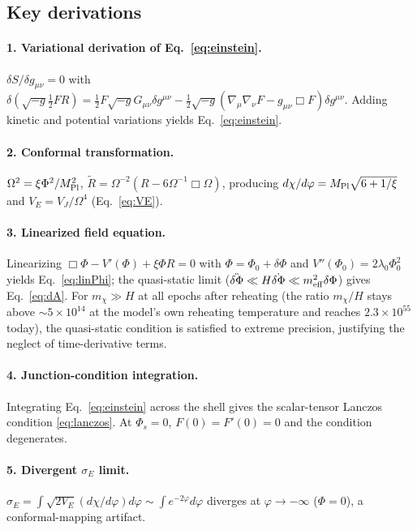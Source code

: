 \documentclass[pdflatex,sn-mathphys-num]{sn-jnl}
\newcommand{\MP}{M_{\rm Pl}}
\newcommand{\PhiV}{\Phi_0}
\theoremstyle{thmstyleone}
\begin{document}
\begin{appendices}
\section{Key derivations}

\paragraph{1. Variational derivation of Eq.~\eqref{eq:einstein}.} $\delta S/\delta g_{\mu\nu}=0$ with $\delta(\sqrt{-g}\frac12 FR)=\frac12 F\sqrt{-g}G_{\mu\nu}\delta g^{\mu\nu}-\frac12\sqrt{-g}(\nabla_\mu\nabla_\nu F-g_{\mu\nu}\Box F)\delta g^{\mu\nu}$. Adding kinetic and potential variations yields Eq.~\eqref{eq:einstein}.

\paragraph{2. Conformal transformation.} $\Omega^2=\xi\Phi^2/\MP^2$, $\tilde R=\Omega^{-2}(R-6\Omega^{-1}\Box\Omega)$, producing $d\chi/d\varphi=\MP\sqrt{6+1/\xi}$ and $V_E=V_J/\Omega^4$ (Eq.~\eqref{eq:VE}).

\paragraph{3. Linearized field equation.} Linearizing $\Box\Phi-V'(\Phi)+\xi\Phi R=0$ with $\Phi=\PhiV+\delta\Phi$ and $V''(\PhiV)=2\lambda_0\PhiV^2$ yields Eq.~\eqref{eq:linPhi}; the quasi-static limit ($\ddot{\delta\Phi}\ll H\dot{\delta\Phi}\ll m_{\rm eff}^2\delta\Phi$) gives Eq.~\eqref{eq:dA}. For $m_\chi\gg H$ at all epochs after reheating (the ratio $m_\chi/H$ stays above $\sim5\times10^{14}$ at the model's own reheating temperature and reaches $2.3\times10^{55}$ today), the quasi-static condition is satisfied to extreme precision, justifying the neglect of time-derivative terms.

\paragraph{4. Junction-condition integration.} Integrating Eq.~\eqref{eq:einstein} across the shell gives the scalar-tensor Lanczos condition \eqref{eq:lanczos}. At $\Phi_s=0$, $F(0)=F'(0)=0$ and the condition degenerates.

\paragraph{5. Divergent $\sigma_E$ limit.} $\sigma_E=\int\sqrt{2V_E}(d\chi/d\varphi)d\varphi\sim\int e^{-2\varphi}d\varphi$ diverges at $\varphi\to-\infty$ ($\Phi=0$), a conformal-mapping artifact.


\end{appendices}
\end{document}
